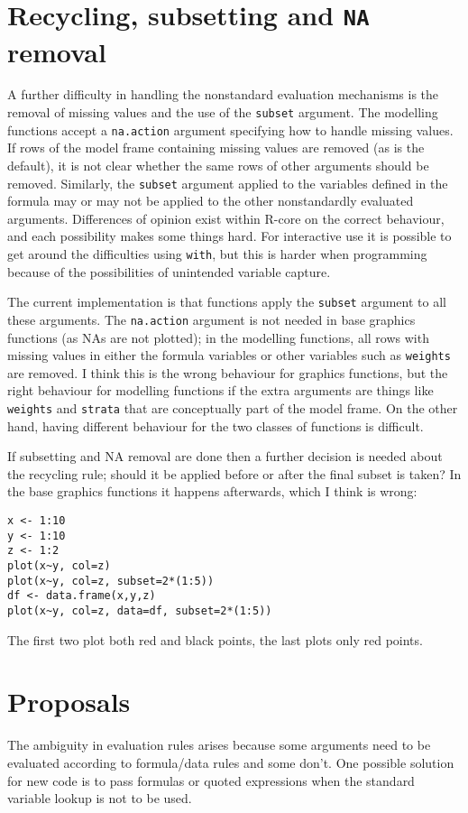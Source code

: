 \documentclass[11pt]{article}
\begin{document}
\section{Recycling, subsetting and \texttt{NA} removal}
A further difficulty in handling the nonstandard evaluation mechanisms is the removal of missing values and the use of the \texttt{subset} argument.  The modelling functions accept a \texttt{na.action} argument specifying how to handle missing values. If rows of the model frame containing missing values are removed (as is the default), it is not clear whether the same rows of other arguments should be removed.  Similarly, the \texttt{subset} argument applied to the variables defined in the formula may or may not be applied to the other nonstandardly evaluated arguments.  Differences of opinion exist within R-core on the correct behaviour, and each possibility makes some things hard.   For interactive use it is possible to get around the difficulties using \texttt{with}, but this is harder when programming because of the possibilities of unintended variable capture.

The current implementation is that functions apply the \texttt{subset} argument to all these arguments.  The \texttt{na.action} argument is not needed in base graphics functions (as NAs are not plotted); in the modelling functions, all rows with missing values in either the formula variables or other variables such as \texttt{weights} are removed.   I think this is the wrong behaviour for graphics functions, but the right behaviour for modelling functions if the extra arguments are things like \texttt{weights} and \texttt{strata} that are conceptually part of the model frame.  On the other hand, having different behaviour for the two classes of functions is difficult.

If subsetting and NA removal are done then a further decision is needed about the recycling rule; should it be applied before or after the final subset is taken?  In the base graphics functions it happens afterwards, which I think is wrong:
\begin{verbatim}
x <- 1:10
y <- 1:10
z <- 1:2
plot(x~y, col=z)                        
plot(x~y, col=z, subset=2*(1:5))  
df <- data.frame(x,y,z)
plot(x~y, col=z, data=df, subset=2*(1:5))
\end{verbatim}
The first two plot both red and black points, the last plots only red points.


\section{Proposals}
The ambiguity in evaluation rules arises because some arguments need to be evaluated according to formula/data rules and some don't.  One possible solution for new code is to pass formulas or quoted expressions when the standard variable lookup is not to be used.
\end{document}
